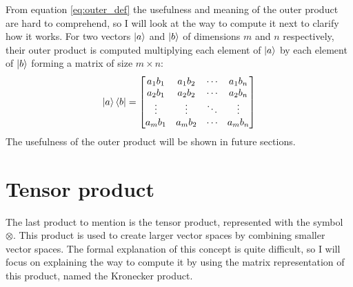 From equation \eqref{eq:outer_def} the usefulness and meaning of the outer product are hard to comprehend, so I will look at the way to compute it next to clarify how it works. For two vectors $\ket{a}$ and $\ket{b}$ of dimensions $m$ and $n$ respectively, their outer product is computed multiplying each element of $\ket{a}$ by each element of $\ket{b}$ forming a matrix of size $ m \times n$:
$$
\ket{a}\bra{b} = \begin{bmatrix}
	a_1 b_1 & a_1 b_2 & \cdots & a_1 b_n \\
	a_2 b_1 & a_2 b_2 & \cdots & a_2 b_n \\
	\vdots  & \vdots  & \ddots& \vdots  \\
	a_m b_1 & a_m b_2 & \cdots & a_m b_n \\
\end{bmatrix}
$$
The usefulness of the outer product will be shown in future sections.

\section{Tensor product}
The last product to mention is the tensor product, represented with the symbol $\otimes$. This product is used to create larger vector spaces by combining smaller vector spaces. The formal explanation of this concept is quite difficult, so I will focus on explaining the way to compute it by using the matrix representation of this product, named the Kronecker product. 

